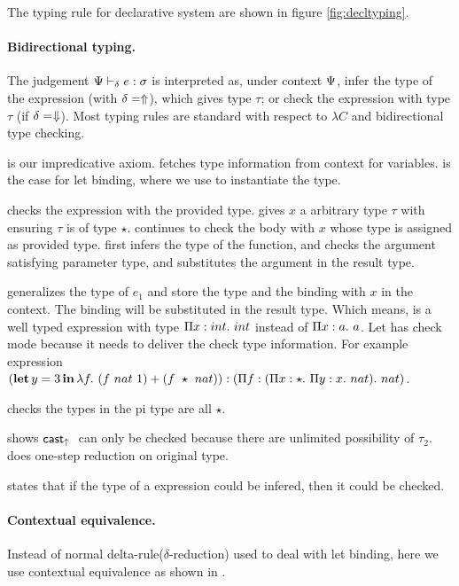 The typing rule for declarative system are shown in figure \ref{fig:decltyping}.

\paragraph{Bidirectional typing.} The judgement $\dpreall e:\sigma \trto t$ is interpreted as, under context $\dctx$, infer the type of the expression (with $\delta=\Inf$), which gives type $\tau$; or check the expression with type $\tau$ (if $\delta = \Chk$). Most typing rules are standard with respect to $\lambda C$ and bidirectional type checking.

 is our impredicative axiom.  fetches type information from context for variables.  is the case for let binding, where we use  to instantiate the type.

 checks the expression with the provided type.  gives $x$ a arbitrary type $\tau$ with ensuring $\tau$ is of type $\star$.  continues to check the body with $x$ whose type is assigned as provided type.  first infers the type of the function, and checks the argument satisfying parameter type, and substitutes the argument in the result type.

 generalizes the type of $e_1$ and store the type and the binding with $x$ in the context. The binding will be substituted in the result type. Which means,  is a well typed expression with type $\bpi x {int} {int}$ instead of $\bpi x a a $. Let has check mode because it needs to deliver the check type information. For example expression $(\kw{let} y = 3 \kw{in} \erlam f {(f~nat~1) + (f~\star~nat))}: (\bpi f {(\bpi x \star {\bpi y x nat})} nat)$.

 checks the types in the pi type are all $\star$.

 shows $\ercastup$ can only be checked because there are unlimited possibility of $\tau_2$.  does one-step reduction on original type.

 states that if the type of a expression could be infered, then it could be checked.

\paragraph{Contextual equivalence.} Instead of normal delta-rule($\delta$-reduction) used to deal with let binding, here we use contextual equivalence as shown in .

